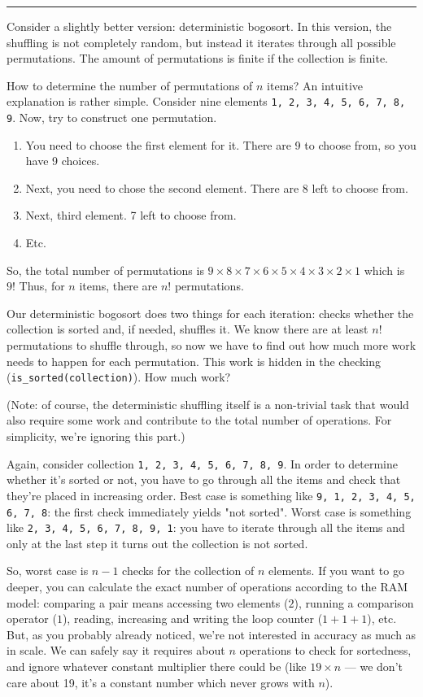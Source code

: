 \documentclass[a4paper, justified, notitlepage, sfsidenotes, notoc]{tufte-book}
\begin{document}
\noindent\rule{\textwidth}{0.5pt}

Consider a slightly better version: deterministic bogosort. In this version, the shuffling is not completely random, but instead it iterates through all possible permutations. The amount of permutations is finite if the collection is finite.

How to determine the number of permutations of \(n\) items? An intuitive explanation is rather simple. Consider nine elements \texttt{1, 2, 3, 4, 5, 6, 7, 8, 9}. Now, try to construct one permutation.

\begin{enumerate}
\item You need to choose the first element for it. There are 9 to choose from, so you have 9 choices.
\item Next, you need to chose the second element. There are 8 left to choose from.
\item Next, third element. 7 left to choose from.
\item Etc.
\end{enumerate}

So, the total number of permutations is \(9\times8\times7\times6\times5\times4\times3\times2\times1\) which is \(9!\) Thus, for \(n\) items, there are \(n!\) permutations.

Our deterministic bogosort does two things for each iteration: checks whether the collection is sorted and, if needed, shuffles it. We know there are at least \(n!\) permutations to shuffle through, so now we have to find out how much more work needs to happen for each permutation. This work is hidden in the checking (\texttt{is\_sorted(collection)}). How much work?

(Note: of course, the deterministic shuffling itself is a non-trivial task that would also require some work and contribute to the total number of operations. For simplicity, we're ignoring this part.)

Again, consider collection \texttt{1, 2, 3, 4, 5, 6, 7, 8, 9}. In order to determine whether it's sorted or not, you have to go through all the items and check that they're placed in increasing order. Best case is something like \texttt{9, 1, 2, 3, 4, 5, 6, 7, 8}: the first check immediately yields "not sorted". Worst case is something like \texttt{2, 3, 4, 5, 6, 7, 8, 9, 1}: you have to iterate through all the items and only at the last step it turns out the collection is not sorted.

So, worst case is \(n-1\) checks for the collection of \(n\) elements. If you want to go deeper, you can calculate the exact number of operations according to the RAM model: comparing a pair means accessing two elements (\(2\)), running a comparison operator (\(1\)), reading, increasing and writing the loop counter (\(1 + 1 + 1\)), etc. But, as you probably already noticed, we're not interested in accuracy as much as in scale. We can safely say it requires about \(n\) operations to check for sortedness, and ignore whatever constant multiplier there could be (like \(19 \times n\) — we don't care about 19, it's a constant number which never grows with \(n\)).
\end{document}
